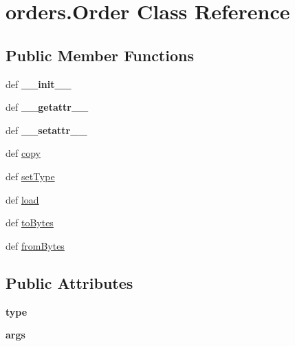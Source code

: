 \hypertarget{classorders_1_1_order}{\section{orders.\-Order \-Class \-Reference}
\label{classorders_1_1_order}
}
\subsection*{\-Public \-Member \-Functions}
\begin{DoxyCompactItemize}
\item 
\hypertarget{classorders_1_1_order_a9edb54cb84082a08a74e530fd1e76b1b}{def {\bfseries \-\_\-\-\_\-init\-\_\-\-\_\-}}\label{classorders_1_1_order_a9edb54cb84082a08a74e530fd1e76b1b}

\item 
\hypertarget{classorders_1_1_order_a59845607c6c2fa3acd7de4a2ce77dcc9}{def {\bfseries \-\_\-\-\_\-getattr\-\_\-\-\_\-}}\label{classorders_1_1_order_a59845607c6c2fa3acd7de4a2ce77dcc9}

\item 
\hypertarget{classorders_1_1_order_a2e56120bbdf2113577a02c4363c62962}{def {\bfseries \-\_\-\-\_\-setattr\-\_\-\-\_\-}}\label{classorders_1_1_order_a2e56120bbdf2113577a02c4363c62962}

\item 
def \hyperlink{classorders_1_1_order_a078dacfd495f75c137de77d841befb70}{copy}
\item 
def \hyperlink{classorders_1_1_order_aa008e119a00013ed8483f6a4ea7245d9}{set\-Type}
\item 
def \hyperlink{classorders_1_1_order_a780c0dbab2da2360364f90ab01eb844f}{load}
\item 
def \hyperlink{classorders_1_1_order_ac2672b32c4cbe4666d7d1cdf71cd54b7}{to\-Bytes}
\item 
def \hyperlink{classorders_1_1_order_a66e727b5ba70f44495cd2a15e079c9eb}{from\-Bytes}
\end{DoxyCompactItemize}
\subsection*{\-Public \-Attributes}
\begin{DoxyCompactItemize}
\item 
\hypertarget{classorders_1_1_order_afb4003458342b2aeebb67c8bc89afefa}{{\bfseries type}}\label{classorders_1_1_order_afb4003458342b2aeebb67c8bc89afefa}

\item 
\hypertarget{classorders_1_1_order_a04e5f09b80a685f731d291e0de2a61db}{{\bfseries args}}\label{classorders_1_1_order_a04e5f09b80a685f731d291e0de2a61db}

\end{DoxyCompactItemize}
